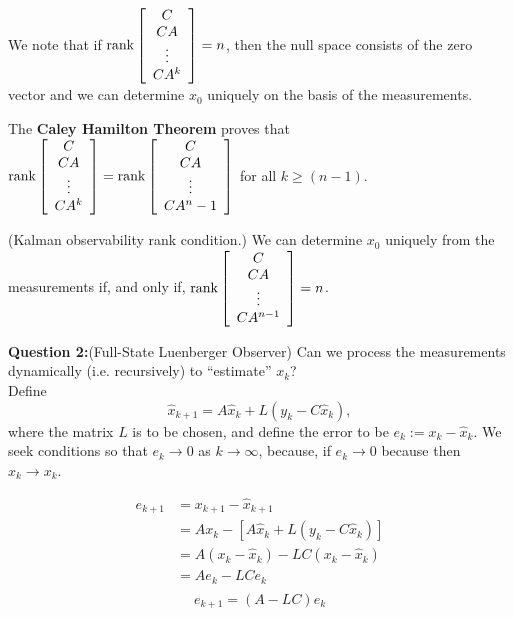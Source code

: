 {We note that if $\mathrm{rank}\left[ \begin{array}{c} C \\ CA \\ \vdots \\ CA^k \end{array} \right] = n$, then the null space consists of the zero vector and we can determine $x_0$ uniquely on the basis of the measurements.

The \textbf{Caley Hamilton Theorem} proves that 
$\mathrm{rank}\left[ \begin{array}{c} C \\ CA \\ \vdots \\ CA^{k} \end{array} \right] = \mathrm{rank}\left[ \begin{array}{c} C \\ CA \\ \vdots \\ CA^n-1 \end{array} \right]$ for all $k \ge (n-1).$ 

\begin{fact}(Kalman observability rank condition.) We can determine $x_0$ uniquely from the measurements if, and only if, $\mathrm{rank}\left[ \begin{array}{c} C \\ CA \\ \vdots \\ CA^{n-1} \end{array} \right] = n$.
\end{fact} 

\textbf{Question 2:}(Full-State Luenberger Observer) Can we process the measurements dynamically (i.e. recursively) to ``estimate'' $x_k$?\\

Define
$$\hat{x}_{k+1} = A\hat{x}_k + L(y_k - C\hat{x}_k),$$
where the matrix $L$ is to be chosen, and define the error to be $e_k := x_k - \hat{x}_k$. We seek conditions so that $e_k \to 0$ as  $k \to \infty$, because, if $e_k \to 0$ because then $\hat{x}_k \to x_k$.

\begin{align*}
e_{k+1} & = x_{k+1} - \hat{x}_{k+1}\\
& = Ax_k - \left[A\hat{x}_k+L(y_k - C\hat{x}_k)\right]\\
& = A(x_k - \hat{x}_k) - LC(x_k - \hat{x}_k)\\
& = Ae_k-LCe_k\\
\end{align*}
$$\boxed{e_{k+1} = (A-LC)e_k}$$



}
